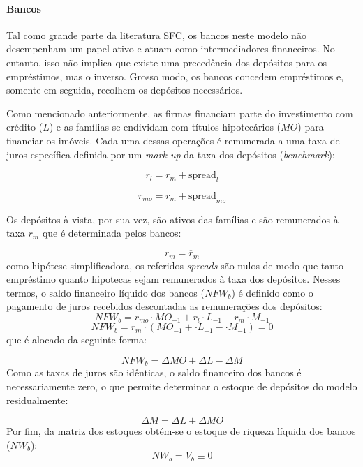 \paragraph*{Bancos} Tal como grande parte da literatura SFC, os bancos neste modelo não desempenham um papel ativo e atuam como intermediadores financeiros. No entanto, isso não implica que existe uma precedência dos depósitos para os empréstimos, mas o inverso. Grosso modo, os bancos concedem empréstimos e, somente em seguida, recolhem os depósitos necessários. 

Como mencionado anteriormente, as firmas financiam parte do investimento com crédito ($L$) e as famílias se endividam com títulos hipotecários ($MO$) para financiar os imóveis. Cada uma dessas operações é remunerada a uma taxa de juros específica definida por um \textit{mark-up} da taxa dos depósitos (\textit{benchmark}):

\begin{equation}
    r_l = r_m + \text{spread}_l
\end{equation}

\begin{equation}
    r_{mo} = r_m + \text{spread}_{mo}
\end{equation}

Os depósitos à vista, por sua vez, são ativos das famílias e são remunerados à taxa $r_m$ que é determinada pelos bancos:

\begin{equation}
    r_m = \overline r_m
\end{equation}
como hipótese simplificadora, os referidos \textit{spreads} são nulos de modo que tanto empréstimo quanto hipotecas sejam remunerados à taxa dos depósitos. Nesses termos, o saldo financeiro líquido dos bancos ($NFW_b$) é definido como o pagamento de juros recebidos descontadas as remunerações dos depósitos:
\begin{equation}
    NFW_b = r_{mo}\cdot MO_{-1} + r_l\cdot L_{-1} - r_m\cdot M_{-1}
\end{equation}
$$
    NFW_b = r_{m}\cdot (MO_{-1} + \cdot L_{-1} - \cdot M_{-1}) = 0
$$
que é alocado da seguinte forma:

$$
NFW_b = \Delta MO + \Delta L - \Delta M
$$
Como as taxas de juros são idênticas, o saldo financeiro dos bancos é necessariamente zero, o que permite determinar o estoque de depósitos do modelo residualmente:

\begin{equation}
\label{_M}
    \Delta M = \Delta L + \Delta MO
\end{equation}
Por fim, da matriz dos estoques obtém-se o estoque de riqueza líquida dos bancos ($NW_b$):
\begin{equation}
    NW_b = V_b \equiv 0
\end{equation}

